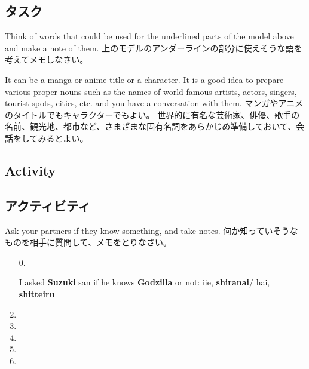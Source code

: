 \documentclass[uplatex,dvipdfmx,b5paper,english,10pt]{jsbook}
\begin{document}
\subsection{タスク}
\fi

\begin{toiquestion}
\ifEnglish
Think of words that could be used for the underlined parts of the model above and make a note of them.
\else
上のモデルのアンダーラインの部分に使えそうな語を考えてメモしなさい。
\fi
\end{toiquestion}
\begin{toianswer}
\ifEnglish
It can be a manga or anime title or a character.
It is a good idea to prepare various proper nouns such as the names of world-famous artists, actors, singers, tourist spots, cities, etc. and you have a conversation with them.
\else
マンガやアニメのタイトルでもキャラクターでもよい。
世界的に有名な芸術家、俳優、歌手の名前、観光地、都市など、さまざまな固有名詞をあらかじめ準備しておいて、会話をしてみるとよい。
\fi
\end{toianswer}


\ifEnglish
\subsection{Activity}
\else
\subsection{アクティビティ}
\fi

\begin{toiquestion}
\ifEnglish
Ask your partners if they know something, and take notes.
\else
何か知っていそうなものを相手に質問して、メモをとりなさい。
\fi
\end{toiquestion}

\begin{enumerate}
 \item[0.] \hrulefill\par
	   \vspace{-1.2\baselineskip}\hspace{.5em}I asked {\bfseries Suzuki} san if he knows {\bfseries Godzilla } or not: iie, {\bfseries shiranai}/ hai, {\bfseries shitteiru}

 	   \vspace{.2\baselineskip}

 \item \hrulefill
 \item \hrulefill
 \item \hrulefill
 \item \hrulefill
 \item \hrulefill
\end{enumerate}
\end{document}
